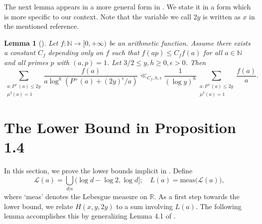 \documentclass{amsart}
\newtheorem{lemma}[theorem]{Lemma}
\theoremstyle{definition}
\numberwithin{equation}{section}
\newcommand{\N}{\mathbb{N}}
\newcommand{\R}{\mathbb{R}}
\begin{document}
	The next lemma appears in a more general form in \cite{koukoulopoulos2010localized}. We state it in a form which is more specific to our context. Note that the variable we call $2y$ is written as $x$ in the mentioned reference.
	\begin{lemma}[{\cite[Lemma 2.2 (b)]{koukoulopoulos2010localized}}] \label{dimitris lemma 2.2}
		Let $f : \N \to [0,+\infty)$ be an arithmetic function. Assume there exists a constant $C_f$ depending only on $f$ such that $f(ap) \leq C_f f(a)$ for all $a \in \N$ and all primes $p$ with $(a,p) = 1$. Let $3/2 \leq y, h \geq 0, \epsilon > 0$. Then
		$$\sum_{\substack{a: P^+(a) \leq 2y \\ \mu^2(a) = 1}}\frac{f(a)}{a \log^h(P^+(a)+(2y)^\epsilon/a)} \ll_{C_f,h,\epsilon} \frac{1}{(\log y)^h}\sum_{\substack{a: P^+(a) \leq 2y \\ \mu^2(a) = 1}}\frac{f(a)}{a}.$$
	\end{lemma}
	
	
	
	
	
	
	
	\section{The Lower Bound in Proposition 1.4}\label{sec lower bounds}
	In this section, we prove the lower bounds implicit in . Define
	\begin{equation}\label{def L}
		\mathscr{L}(a) = \bigcup_{d|a}(\log d - \log 2, \log d]; \quad L(a) = \text{meas} \big(\mathscr{L}(a)\big),
	\end{equation}
	where `meas' denotes the Lebesgue measure on $\R$. As a first step towards the lower bound, we relate $H(x,y,2y)$ to a sum involving $L(a)$. The following lemma accomplishes this by generalizing Lemma 4.1 of \cite{ford2008distribution}.
	
\end{document}

